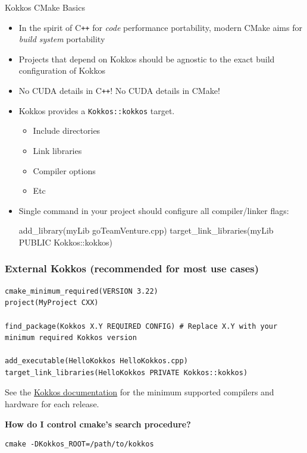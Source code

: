 \begin{frame}[fragile]{Kokkos CMake Basics}
\begin{itemize}
\item In the spirit of C\texttt{++} for \emph{code} performance portability, modern CMake aims for \emph{build system} portability
\item Projects that depend on Kokkos should be agnostic to the exact build configuration of Kokkos
\item No CUDA details in C\texttt{++}! No CUDA details in CMake!
\item Kokkos provides a \texttt{Kokkos::kokkos} target.
  \begin{itemize}
  \item Include directories
  \item Link libraries
  \item Compiler options
  \item Etc
  \end{itemize}
 
\item Single command in your project should configure all compiler/linker flags:

\begin{shell}
add_library(myLib goTeamVenture.cpp)
target_link_libraries(myLib PUBLIC Kokkos::kokkos)
\end{shell}
\end{itemize}
\end{frame}

\begin{frame}[fragile]
\frametitle{External Kokkos (recommended for most use cases)}

\begin{verbatim}
cmake_minimum_required(VERSION 3.22)
project(MyProject CXX)

find_package(Kokkos X.Y REQUIRED CONFIG) # Replace X.Y with your minimum required Kokkos version

add_executable(HelloKokkos HelloKokkos.cpp)
target_link_libraries(HelloKokkos PRIVATE Kokkos::kokkos)
\end{verbatim}

\vspace{1eM}
{\scriptsize See the \href{https://kokkos.org/kokkos-core-wiki/get-started/requirements.html}{Kokkos documentation} for the minimum supported compilers and hardware for each release.}

\vspace{2eM}
\textbf{How do I control cmake's search procedure?}

\vspace{1eM}
\begin{verbatim}
cmake -DKokkos_ROOT=/path/to/kokkos
\end{verbatim}
\end{frame}

